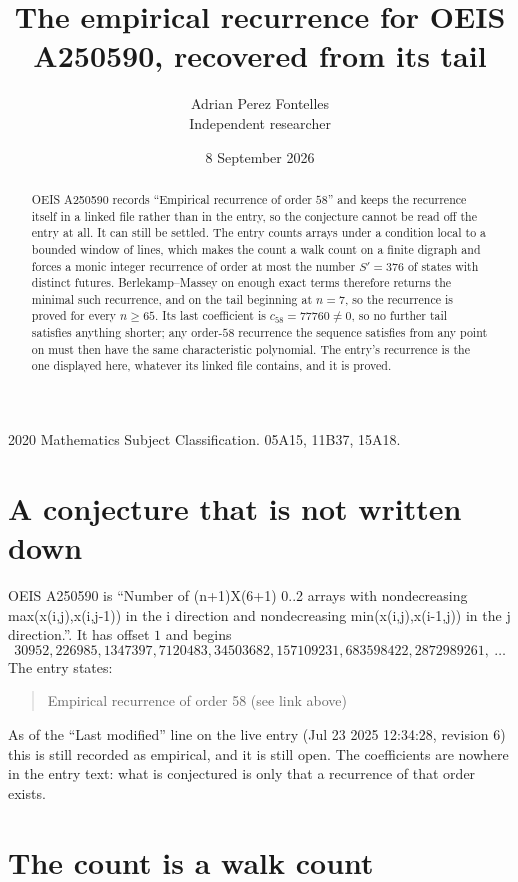 \documentclass[11pt,a4paper]{article}
\title{The empirical recurrence for OEIS A250590, recovered from its tail}
\author{Adrian Perez Fontelles\\ \small Independent researcher}
\date{8 September 2026}
\theoremstyle{plain}
\theoremstyle{definition}
\begin{document}
\maketitle

\begin{abstract}
OEIS A250590 records ``Empirical recurrence of order $58$'' and keeps the recurrence itself in
a linked file rather than in the entry, so the conjecture cannot be read off the entry at all.
It can still be settled. The entry counts arrays under a condition local to a bounded window of
lines, which makes the count a walk count on a finite digraph and forces a monic integer
recurrence of order at most the number $S'=376$ of states with distinct futures. Berlekamp--Massey on
enough exact terms therefore returns the minimal such recurrence, and on the tail beginning at $n=7$, so the recurrence is proved for every $n\ge65$.
Its last coefficient is $c_{58}=77760\neq0$, so no further tail satisfies anything
shorter; any order-$58$ recurrence the sequence satisfies from any point on must then have
the same characteristic polynomial. The entry's recurrence is the one displayed here, whatever
its linked file contains, and it is proved.
\end{abstract}

\noindent\small 2020 Mathematics Subject Classification. 05A15, 11B37, 15A18.\normalsize

\section{A conjecture that is not written down}

OEIS A250590 is ``Number of (n+1)X(6+1) 0..2 arrays with nondecreasing max(x(i,j),x(i,j-1)) in the i direction and nondecreasing min(x(i,j),x(i-1,j)) in the j direction.''. It has offset $1$ and begins
\[
30952, 226985, 1347397, 7120483, 34503682, 157109231, 683598422, 2872989261,\ \dots
\]
The entry states:
\begin{quote}
Empirical recurrence of order 58 (see link above)
\end{quote}
As of the ``Last modified'' line on the live entry (Jul 23 2025 12:34:28, revision 6)
this is still recorded as empirical, and it is still open. The coefficients are nowhere in the
entry text: what is conjectured is only that a recurrence of that order exists.

\section{The count is a walk count}
\end{document}
